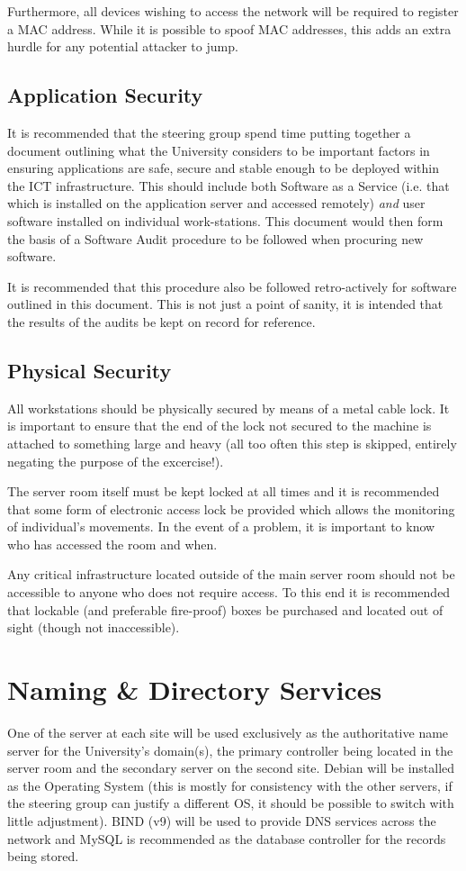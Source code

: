 \documentclass[a4paper, twoside]{article}
\begin{document}
Furthermore, all devices wishing to access the network will be required to
register a MAC address. While it is possible to spoof MAC addresses, this adds
an extra hurdle for any potential attacker to jump.

\subsection{Application Security}
It is recommended that the steering group spend time putting together a document
outlining what the University considers to be important factors in ensuring
applications are safe, secure and stable enough to be deployed within the ICT
infrastructure. This should include both Software as a Service (i.e. that which
is installed on the application server and accessed remotely) \emph{and} user
software installed on individual work-stations. This document would then form
the basis of a Software Audit procedure to be followed when procuring new
software.

It is recommended that this procedure also be followed retro-actively for
software outlined in this document. This is not just a point of sanity, it is
intended that the results of the audits be kept on record for reference.

\subsection{Physical Security}
All workstations should be physically secured by means of a metal cable lock. It
is important to ensure that the end of the lock not secured to the machine is
attached to something large and heavy (all too often this step is skipped,
entirely negating the purpose of the excercise!).

The server room itself must be kept locked at all times and it is recommended
that some form of electronic access lock be provided which allows the monitoring
of individual's movements. In the event of a problem, it is important to know
who has accessed the room and when.

Any critical infrastructure located outside of the main server room should not
be accessible to anyone who does not require access. To this end it is
recommended that lockable (and preferable fire-proof) boxes be purchased and
located out of sight (though not inaccessible).

\section{Naming \& Directory Services}
One of the server at each site will be used exclusively as the authoritative name server for
the University's domain(s), the primary controller being located in the server
room and the secondary server on the second site. Debian will be installed as the Operating System
(this is mostly for consistency with the other servers, if the steering group
can justify a different OS, it should be possible to switch with little
adjustment). BIND (v9) will be used to provide DNS services across the network
and MySQL is recommended as the database controller for the records being
stored.
\end{document}
